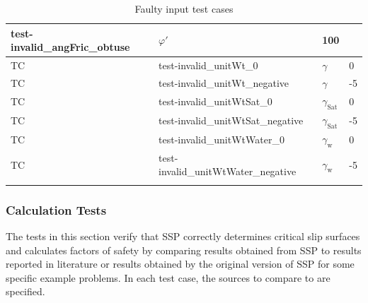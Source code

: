 \documentclass[12pt, titlepage]{article}
\newcounter{testnum} %
\newcommand{\progname}{SSP}
\begin{document}
\begin{longtable}{  l  p{5cm}  l  p{5cm}  }
	test-invalid\_angFric\_obtuse & $\varphi'$ & 100\\ 
	\hline
	TC{testnum}\thetestnum \label{TC_InvalidUnitWt0} & 
	test-invalid\_unitWt\_0 & $\gamma$ & 0\\ 
	\hline
	TC{testnum}\thetestnum \label{TC_InvalidUnitWtNegative} & 
	test-invalid\_unitWt\_negative & $\gamma$ & -5\\ 
	\hline
	TC{testnum}\thetestnum \label{TC_InvalidUnitWtSat0} & 
	test-invalid\_unitWtSat\_0 & $\gamma_\text{Sat}$ & 0\\ 
	\hline
	TC{testnum}\thetestnum \label{TC_InvalidUnitWtSatNegative} & 
	test-invalid\_unitWtSat\_negative & $\gamma_\text{Sat}$ & -5\\ 
	\hline
	TC{testnum}\thetestnum \label{TC_InvalidUnitWtWater0} & 
	test-invalid\_unitWtWater\_0 & $\gamma_\text{w}$ & 0\\ 
	\hline
	TC{testnum}\thetestnum \label{TC_InvalidUnitWtWaterNegative} 
	& test-invalid\_unitWtWater\_negative & $\gamma_\text{w}$ & -5\\ 
	\hline
	\caption{Faulty input test cases}
	\label{FaultyInputTests}
\end{longtable}


\subsubsection{Calculation Tests} \label{sec_CalcTCs}

The tests in this section verify that \progname{} correctly determines critical 
slip surfaces and calculates factors of safety by comparing results obtained 
from \progname{} to results reported in literature or results obtained by the 
original version of \progname{} for some specific example problems. In each 
test case, the sources to compare to are specified.
\end{document}

